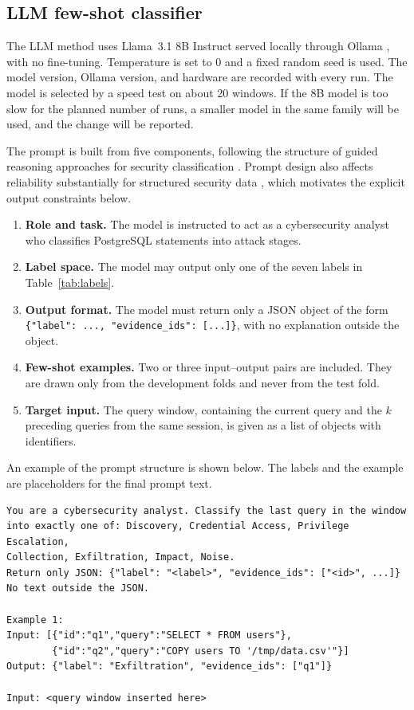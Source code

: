 \documentclass[12pt,a4paper]{report}
\begin{document}
\subsection{LLM few-shot classifier}
The LLM method uses Llama~3.1 8B Instruct served locally through Ollama \cite{ollama_docs}, with no fine-tuning. Temperature is set to 0 and a fixed random seed is used. The model version, Ollama version, and hardware are recorded with every run. The model is selected by a speed test on about 20 windows. If the 8B model is too slow for the planned number of runs, a smaller model in the same family will be used, and the change will be reported.

The prompt is built from five components, following the structure of guided reasoning approaches for security classification \cite{meng_rhino_2025,meng_benchmarking_2026}. Prompt design also affects reliability substantially for structured security data \cite{rehman_flows_2025}, which motivates the explicit output constraints below.
\begin{enumerate}
    \item \textbf{Role and task.} The model is instructed to act as a cybersecurity analyst who classifies PostgreSQL statements into attack stages.
    \item \textbf{Label space.} The model may output only one of the seven labels in Table~\ref{tab:labels}.
    \item \textbf{Output format.} The model must return only a JSON object of the form \texttt{\{"label": ..., "evidence\_ids": [...]\}}, with no explanation outside the object.
    \item \textbf{Few-shot examples.} Two or three input–output pairs are included. They are drawn only from the development folds and never from the test fold.
    \item \textbf{Target input.} The query window, containing the current query and the $k$ preceding queries from the same session, is given as a list of objects with identifiers.
\end{enumerate}

An example of the prompt structure is shown below. The labels and the example are placeholders for the final prompt text.

\begin{verbatim}
You are a cybersecurity analyst. Classify the last query in the window
into exactly one of: Discovery, Credential Access, Privilege Escalation,
Collection, Exfiltration, Impact, Noise.
Return only JSON: {"label": "<label>", "evidence_ids": ["<id>", ...]}
No text outside the JSON.

Example 1:
Input: [{"id":"q1","query":"SELECT * FROM users"},
        {"id":"q2","query":"COPY users TO '/tmp/data.csv'"}]
Output: {"label": "Exfiltration", "evidence_ids": ["q1"]}

Input: <query window inserted here>
\end{verbatim}
\end{document}

